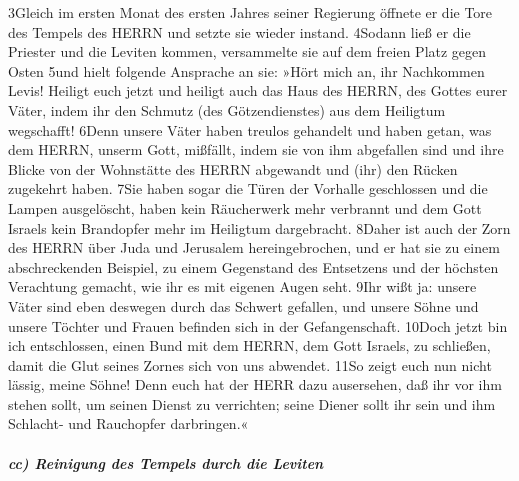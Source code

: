 3Gleich im ersten Monat des ersten Jahres seiner Regierung öffnete er
die Tore des Tempels des HERRN und setzte sie wieder instand. 4Sodann
ließ er die Priester und die Leviten kommen, versammelte sie auf dem
freien Platz gegen Osten 5und hielt folgende Ansprache an sie: »Hört
mich an, ihr Nachkommen Levis! Heiligt euch jetzt und heiligt auch das
Haus des HERRN, des Gottes eurer Väter, indem ihr den Schmutz (des
Götzendienstes) aus dem Heiligtum wegschafft! 6Denn unsere Väter haben
treulos gehandelt und haben getan, was dem HERRN, unserm Gott, mißfällt,
indem sie von ihm abgefallen sind und ihre Blicke von der Wohnstätte des
HERRN abgewandt und (ihr) den Rücken zugekehrt haben. 7Sie haben sogar
die Türen der Vorhalle geschlossen und die Lampen ausgelöscht, haben
kein Räucherwerk mehr verbrannt und dem Gott Israels kein Brandopfer
mehr im Heiligtum dargebracht. 8Daher ist auch der Zorn des HERRN über
Juda und Jerusalem hereingebrochen, und er hat sie zu einem
abschreckenden Beispiel, zu einem Gegenstand des Entsetzens und der
höchsten Verachtung gemacht, wie ihr es mit eigenen Augen seht. 9Ihr
wißt ja: unsere Väter sind eben deswegen durch das Schwert gefallen, und
unsere Söhne und unsere Töchter und Frauen befinden sich in der
Gefangenschaft. 10Doch jetzt bin ich entschlossen, einen Bund mit dem
HERRN, dem Gott Israels, zu schließen, damit die Glut seines Zornes sich
von uns abwendet. 11So zeigt euch nun nicht lässig, meine Söhne! Denn
euch hat der HERR dazu ausersehen, daß ihr vor ihm stehen sollt, um
seinen Dienst zu verrichten; seine Diener sollt ihr sein und ihm
Schlacht- und Rauchopfer darbringen.«

\hypertarget{cc-reinigung-des-tempels-durch-die-leviten}{%
\subparagraph{cc) Reinigung des Tempels durch die
Leviten}\label{cc-reinigung-des-tempels-durch-die-leviten}}


